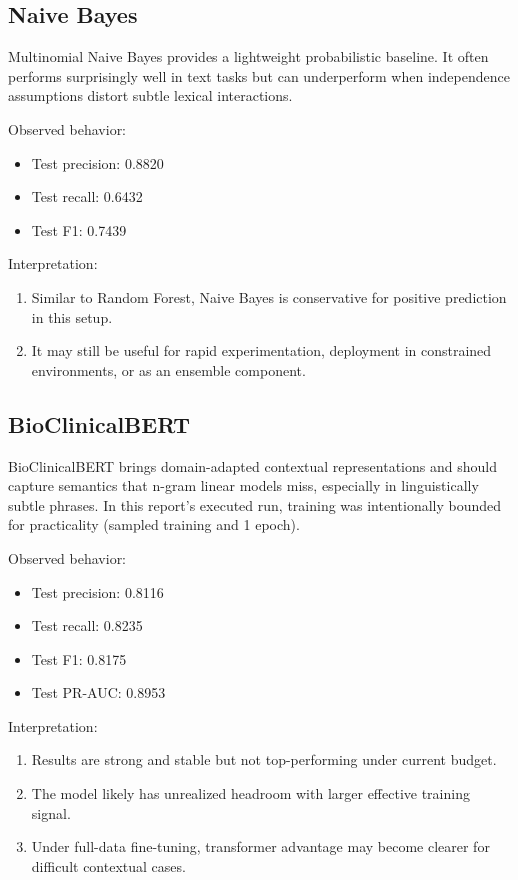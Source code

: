 \documentclass[11pt]{article}
\begin{document}
\subsection{Naive Bayes}

Multinomial Naive Bayes provides a lightweight probabilistic baseline. It often performs surprisingly well in text tasks but can underperform when independence assumptions distort subtle lexical interactions.


Observed behavior:


\begin{itemize}
  \item Test precision: 0.8820
  \item Test recall: 0.6432
  \item Test F1: 0.7439
\end{itemize}

Interpretation:


\begin{enumerate}
  \item Similar to Random Forest, Naive Bayes is conservative for positive prediction in this setup.
  \item It may still be useful for rapid experimentation, deployment in constrained environments, or as an ensemble component.
\end{enumerate}

\subsection{BioClinicalBERT}

BioClinicalBERT brings domain-adapted contextual representations and should capture semantics that n-gram linear models miss, especially in linguistically subtle phrases. In this report's executed run, training was intentionally bounded for practicality (sampled training and 1 epoch).


Observed behavior:


\begin{itemize}
  \item Test precision: 0.8116
  \item Test recall: 0.8235
  \item Test F1: 0.8175
  \item Test PR-AUC: 0.8953
\end{itemize}

Interpretation:


\begin{enumerate}
  \item Results are strong and stable but not top-performing under current budget.
  \item The model likely has unrealized headroom with larger effective training signal.
  \item Under full-data fine-tuning, transformer advantage may become clearer for difficult contextual cases.
\end{enumerate}
\end{document}
